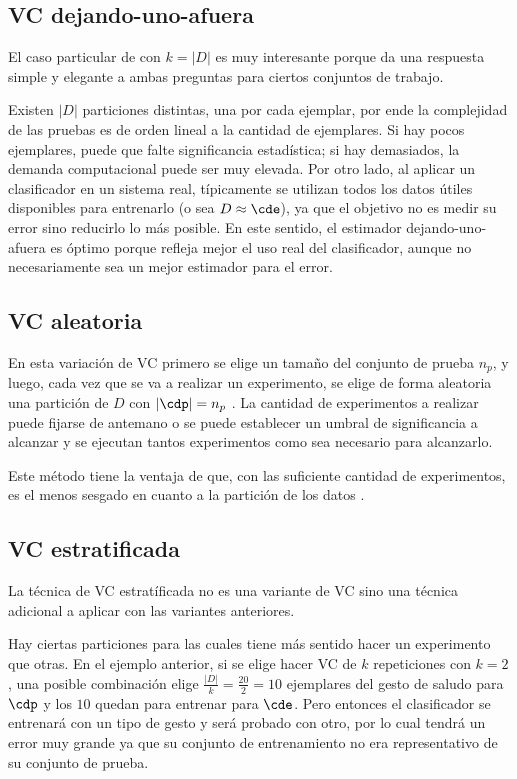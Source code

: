 \subsection{VC dejando-uno-afuera}

El caso particular de \kvc con $k=|D|$ es muy interesante porque da una respuesta simple y elegante a ambas preguntas para ciertos conjuntos de trabajo. 

Existen $|D|$ particiones distintas, una por cada ejemplar, por ende la complejidad de las pruebas es de orden lineal a la cantidad de ejemplares. Si hay pocos ejemplares, puede que falte significancia estadística; si hay demasiados, la demanda computacional puede ser muy elevada. Por otro lado, al aplicar un clasificador en un sistema real, típicamente se utilizan todos los datos útiles disponibles para entrenarlo (o sea $D \approx \cde$), ya que el objetivo no es medir su error sino reducirlo lo más posible. En este sentido, el estimador dejando-uno-afuera es óptimo porque refleja mejor el uso real del clasificador, aunque no necesariamente sea un mejor estimador para el error.


\subsection{VC aleatoria}

En esta variación de VC primero se elige un tamaño del conjunto de prueba $n_p$, y luego, cada vez que se va a realizar un experimento, se elige de forma aleatoria una partición de $D$ con $|\cdp|=n_p$ . La cantidad de experimentos a realizar puede fijarse de antemano o se puede establecer un umbral de significancia a alcanzar y se ejecutan tantos experimentos como sea necesario para alcanzarlo. 

Este método tiene la ventaja de que, con las suficiente cantidad de experimentos, es el menos sesgado en cuanto a la partición de los datos \cite{nadeau2003}.


\subsection{VC estratificada}

La técnica de VC estratíficada no es una variante de VC sino una técnica adicional a aplicar con las variantes anteriores.

Hay ciertas particiones para las cuales tiene más sentido hacer un experimento que otras. En el ejemplo anterior, si se elige hacer VC de $k$ repeticiones con $k=2$, una posible combinación elige $\frac{|D|}{k}=\frac{20}{2}=10$ ejemplares del gesto de saludo para $\cdp$ y los $10$ quedan para entrenar para $\cde$. Pero entonces el clasificador se entrenará con un tipo de gesto y será probado con otro, por lo cual tendrá un error muy grande ya que su conjunto de entrenamiento no era representativo de su conjunto de prueba.

